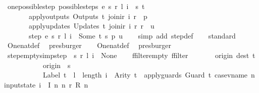 \begin{isabellebody}
\isamarkupfalse%
\ one{\isacharunderscore}possible{\isacharunderscore}step{\isacharcolon}\ {\isachardoublequoteopen}possible{\isacharunderscore}steps\ e\ s\ r\ l\ i\ {\isacharequal}\ {\isacharbraceleft}{\isacharbar}{\isacharparenleft}s{\isacharprime}{\isacharcomma}\ t{\isacharparenright}{\isacharbar}{\isacharbraceright}\ {\isasymLongrightarrow}\isanewline
\ \ \ \ \ \ \ apply{\isacharunderscore}outputs\ {\isacharparenleft}Outputs\ t{\isacharparenright}\ {\isacharparenleft}join{\isacharunderscore}ir\ i\ r{\isacharparenright}\ {\isacharequal}\ p\ {\isasymLongrightarrow}\isanewline
\ \ \ \ \ \ \ apply{\isacharunderscore}updates\ {\isacharparenleft}Updates\ t{\isacharparenright}\ {\isacharparenleft}join{\isacharunderscore}ir\ i\ r{\isacharparenright}\ r\ {\isacharequal}\ u\ {\isasymLongrightarrow}\isanewline
\ \ \ \ \ \ \ step\ e\ s\ r\ l\ i\ {\isacharequal}\ Some\ {\isacharparenleft}t{\isacharcomma}\ s{\isacharprime}{\isacharcomma}\ p{\isacharcomma}\ u{\isacharparenright}{\isachardoublequoteclose}\isanewline
%
\isadelimproof
\ \ %
\endisadelimproof
%
\isatagproof
{}\isamarkupfalse%
\ {\isacharparenleft}simp\ add{\isacharcolon}\ step{\isacharunderscore}def{\isacharparenright}\isanewline
\ \ \isamarkupfalse%
\ standard\isanewline
\ \ \isamarkupfalse%
\ One{\isacharunderscore}nat{\isacharunderscore}def\ \isamarkupfalse%
\ presburger\isanewline
\ \ \isamarkupfalse%
\ One{\isacharunderscore}nat{\isacharunderscore}def\ \isamarkupfalse%
\ presburger%
\endisatagproof
{\isafoldproof}%
%
\isadelimproof
\isanewline
%
\endisadelimproof
\isanewline
{}\isamarkupfalse%
\ step{\isacharunderscore}empty{\isacharbrackleft}simp{\isacharbrackright}{\isacharcolon}{\isachardoublequoteopen}step\ {\isacharbraceleft}{\isacharbar}{\isacharbar}{\isacharbraceright}\ s\ r\ l\ i\ {\isacharequal}\ None{\isachardoublequoteclose}\isanewline
%
\isadelimproof
%
\endisadelimproof
%
\isatagproof
{}\isamarkupfalse%
{\isacharminus}\isanewline
\ \ \isamarkupfalse%
\ ffilter{\isacharunderscore}empty{\isacharcolon}\ {\isachardoublequoteopen}ffilter\isanewline
\ \ \ \ \ \ \ {\isacharparenleft}{\isasymlambda}{\isacharparenleft}{\isacharparenleft}origin{\isacharcomma}\ dest{\isacharparenright}{\isacharcomma}\ t{\isacharparenright}{\isachardot}\isanewline
\ \ \ \ \ \ \ \ \ \ \ origin\ {\isacharequal}\ s\ {\isasymand}\isanewline
\ \ \ \ \ \ \ \ \ \ \ Label\ t\ {\isacharequal}\ l\ {\isasymand}\ length\ i\ {\isacharequal}\ Arity\ t\ {\isasymand}\ apply{\isacharunderscore}guards\ {\isacharparenleft}Guard\ t{\isacharparenright}\ {\isacharparenleft}case{\isacharunderscore}vname\ {\isacharparenleft}{\isasymlambda}n{\isachardot}\ input{}state\ i\ {}\ {\isacharparenleft}I\ n{\isacharparenright}{\isacharparenright}\ {\isacharparenleft}{\isasymlambda}n{\isachardot}\ r\ {\isacharparenleft}R\ n{\isacharparenright}{\isacharparenright}{\isacharparenright}{\isacharparenright}\isanewline

\end{isabellebody}

